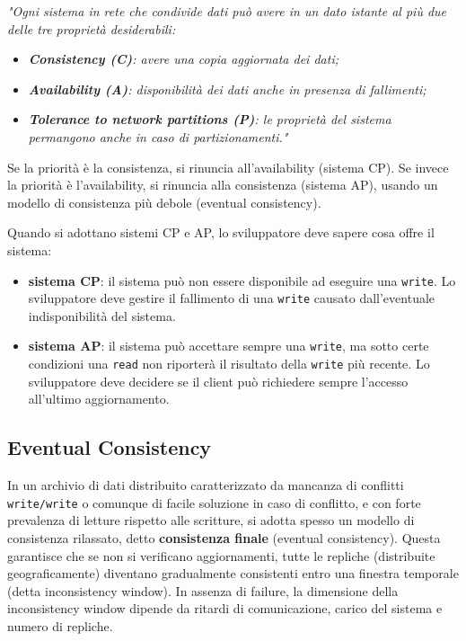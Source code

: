 \vspace{5mm}

\begin{center}
    \textit{"Ogni sistema in rete che condivide dati può avere in un dato istante al più due delle tre proprietà desiderabili:}
    \begin{itemize}
        \item \textit{\textbf{Consistency (C)}: avere una copia aggiornata dei dati;}
        \item \textit{\textbf{Availability (A)}: disponibilità dei dati anche in presenza di fallimenti;}
        \item \textit{\textbf{Tolerance to network partitions (P)}: le proprietà del sistema permangono anche in caso di partizionamenti."}
    \end{itemize}
\end{center}

\vspace{5mm}

Se la priorità è la consistenza, si rinuncia all'availability (sistema CP). Se invece la priorità è l'availability, si rinuncia alla consistenza (sistema AP), usando un modello di consistenza più debole (eventual consistency).

Quando si adottano sistemi CP e AP, lo sviluppatore deve sapere cosa offre il sistema:
\begin{itemize}
    \item \textbf{sistema CP}: il sistema può non essere disponibile ad eseguire una \texttt{write}. Lo sviluppatore deve gestire il fallimento di una \texttt{write} causato dall'eventuale indisponibilità del sistema.
    \item \textbf{sistema AP}: il sistema può accettare sempre una \texttt{write}, ma sotto certe condizioni una \texttt{read} non riporterà il risultato della \texttt{write} più recente. Lo sviluppatore deve decidere se il client può richiedere sempre l'accesso all'ultimo aggiornamento.
\end{itemize}

\subsection{Eventual Consistency}
In un archivio di dati distribuito caratterizzato da mancanza di conflitti \texttt{write/write} o comunque di facile soluzione in caso di conflitto, e con forte prevalenza di letture rispetto alle scritture, si adotta spesso un modello di consistenza rilassato, detto \textbf{consistenza finale} (eventual consistency). Questa garantisce che se non si verificano aggiornamenti, tutte le repliche (distribuite geograficamente) diventano gradualmente consistenti entro una finestra temporale (detta inconsistency window). In assenza di failure, la dimensione della inconsistency window dipende da ritardi di comunicazione, carico del sistema e numero di repliche.

